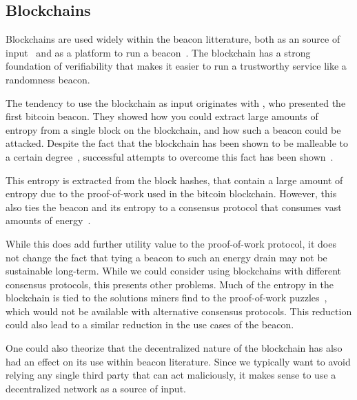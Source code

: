 \subsection{Blockchains}
Blockchains are used widely within the beacon litterature, both as an source of input~\cite{bonneau2015bitcoin, bentov2016bitcoin, bunz2017proofsof} and as a platform to run a beacon~\cite{randao, bunz2017proofsof}.
The blockchain has a strong foundation of verifiability that makes it easier to run a trustworthy service like a randomness beacon.

The tendency to use the blockchain as input originates with \citet{bonneau2015bitcoin}, who presented the first bitcoin beacon.
They showed how you could extract large amounts of entropy from a single block on the blockchain, and how such a beacon could be attacked.
Despite the fact that the blockchain has been shown to be malleable to a certain degree~\cite{pierrot2016malleability}, successful attempts to overcome this fact has been shown~\cite{bunz2017proofsof}.

This entropy is extracted from the block hashes, that contain a large amount of entropy due to the proof-of-work used in the bitcoin blockchain.
However, this also ties the beacon and its entropy to a consensus protocol that consumes vast amounts of energy~\cite{bitcoinenergy}.

While this does add further utility value to the proof-of-work protocol, it does not change the fact that tying a beacon to such an energy drain may not be sustainable long-term.
While we could consider using blockchains with different consensus protocols, this presents other problems.
Much of the entropy in the blockchain is tied to the solutions miners find to the proof-of-work puzzles~\cite{bonneau2015bitcoin}, which would not be available with alternative consensus protocols.
This reduction could also lead to a similar reduction in the use cases of the beacon.

One could also theorize that the decentralized nature of the blockchain has also had an effect on its use within beacon literature.
Since we typically want to avoid relying any single third party that can act maliciously, it makes sense to use a decentralized network as a source of input.

